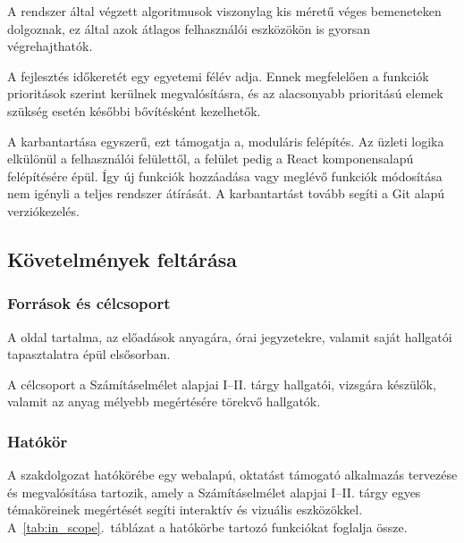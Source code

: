 A rendszer által végzett algoritmusok viszonylag kis méretű véges bemeneteken dolgoznak, ez által
 azok átlagos felhasználói eszközökön is gyorsan végrehajthatók.

A fejlesztés időkeretét egy egyetemi félév adja. Ennek megfelelően a funkciók prioritások szerint 
kerülnek megvalósításra, és az alacsonyabb prioritású elemek szükség esetén későbbi bővítésként kezelhetők.

A karbantartása egyszerű, ezt támogatja a, moduláris felépítés. 
Az üzleti logika elkülönül a felhasználói felülettől, a felület pedig a React komponensalapú felépítésére épül.
Így új funkciók hozzáadása vagy meglévő funkciók módosítása nem igényli a teljes rendszer
átírását. A karbantartást tovább segíti a Git alapú verziókezelés.

\subsection{Követelmények feltárása}

\subsubsection{Források és célcsoport}
A oldal tartalma, az előadások anyagára, órai jegyzetekre, valamit saját hallgatói tapasztalatra épül elsősorban.

 A célcsoport a Számításelmélet alapjai I--II. tárgy hallgatói, vizsgára készülők, 
 valamit az anyag mélyebb megértésére törekvő hallgatók.
\clearpage
\subsubsection{Hatókör}
A szakdolgozat hatókörébe egy webalapú, oktatást támogató alkalmazás
tervezése és megvalósítása tartozik, amely a Számításelmélet
alapjai I--II. tárgy egyes témaköreinek megértését segíti interaktív
és vizuális eszközökkel. A~\ref{tab:in_scope}.~táblázat a hatókörbe
tartozó funkciókat foglalja össze.

